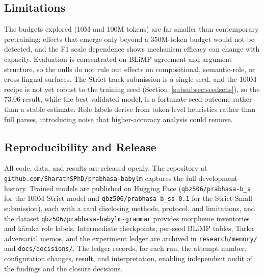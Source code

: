 \subsection{Limitations}

The budgets explored (10M and 100M tokens) are far smaller than contemporary pretraining; effects that emerge only beyond a 350M-token budget would not be detected, and the F1 scale dependence shows mechanism efficacy can change with capacity. Evaluation is concentrated on BLiMP agreement and argument structure, so the nulls do not rule out effects on compositional, semantic-role, or cross-lingual surfaces. The Strict-track submission is a single seed, and the 100M recipe is not yet robust to the training seed (Section~\ref{subsubsec:seedsens}), so the 73.06 result, while the best validated model, is a fortunate-seed outcome rather than a stable estimate. Role labels derive from token-level heuristics rather than full parses, introducing noise that higher-accuracy analysis could remove.

\subsection{Reproducibility and Release}

All code, data, and results are released openly. The repository at \texttt{github.com/SharathSPhD/prabhasa-babylm} captures the full development history. Trained models are published on Hugging Face (\texttt{qbz506/prabhasa-b\_s} for the 100M Strict model and \texttt{qbz506/prabhasa-b\_ss-0.1} for the Strict-Small submission), each with a card disclosing methods, protocol, and limitations, and the dataset \texttt{qbz506/prabhasa-babylm-grammar} provides morpheme inventories and kāraka role labels. Intermediate checkpoints, per-seed BLiMP tables, Tarka adversarial memos, and the experiment ledger are archived in \texttt{research/memory/} and \texttt{docs/decisions/}. The ledger records, for each run, the attempt number, configuration changes, result, and interpretation, enabling independent audit of the findings and the closure decisions.
